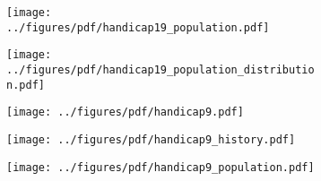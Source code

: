 \documentclass[shownotes]{beamer}
\begin{document}
\begin{frame}
  \begin{figure}[H]     
     \centering \normalsize
     \begin{subfigure}[b]{0.8\textwidth}
     \texttt{[image: ../figures/pdf/handicap19\_population.pdf]} 
     \end{subfigure}
  \end{figure}
\end{frame}


\begin{frame}
  \begin{figure}[H]     
     \centering \normalsize
     \begin{subfigure}[b]{0.8\textwidth}
     \texttt{[image: ../figures/pdf/handicap19\_population\_distribution.pdf]} 
     \end{subfigure}
  \end{figure}
\end{frame}

\begin{frame}
  \begin{figure}[H]     
     \centering \normalsize
     \begin{subfigure}[b]{0.8\textwidth}
     \texttt{[image: ../figures/pdf/handicap9.pdf]} 
     \end{subfigure}
  \end{figure}
\end{frame}

\begin{frame}
  \begin{figure}[H]     
     \centering \normalsize
     \begin{subfigure}[b]{0.8\textwidth}
     \texttt{[image: ../figures/pdf/handicap9\_history.pdf]} 
     \end{subfigure}
  \end{figure}
\end{frame}

\begin{frame}
  \begin{figure}[H]     
     \centering \normalsize
     \begin{subfigure}[b]{0.8\textwidth}
     \texttt{[image: ../figures/pdf/handicap9\_population.pdf]} 
     \end{subfigure}
  \end{figure}
\end{frame}
\end{document}
